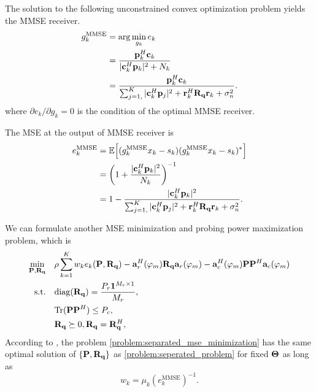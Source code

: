 The solution to the following unconstrained convex optimization problem yields the MMSE receiver.
\begin{align} \label{eqn:separated_mmse_receiver}
    g_k^{\mathrm{MMSE}} & = \arg \min_{g_k} e_k \nonumber
    \\ & = \frac{{\bf p}_k^H {\bf c}_k}{ | {\bf c}_k^H {\bf p}_k|^2 + N_k} \nonumber
    \\ & = \frac{{\bf p}_k^H {\bf c}_k}{\sum_{j=1, }^K |{\bf c}_k^H {\bf p}_j|^2 + {\bf r}_k^H {\bf R}_{\bf q} {\bf r}_k + \sigma^2_n}.
\end{align}
where $\partial e_k / \partial g_k = 0$ is the condition of the 
optimal MMSE receiver.

The MSE at the output of MMSE receiver is 
\begin{align} \label{eqn:separated_mmse_error}
    e_k^{\mathrm{MMSE}} & = \mathbb{E} \Big[(g_k^{\mathrm{MMSE}}x_k - s_k )(g_k^{\mathrm{MMSE}}x_k - s_k )^* \Big] \nonumber
    \\ & = \left(1+\frac{| {\bf c}_k^H {\bf p}_k|^2}{N_k} \right)^{-1} \nonumber
    \\ &= 1 - \frac{| {\bf c}_k^H {\bf p}_k|^2}{\sum_{j=1, }^K |{\bf c}_k^H {\bf p}_j|^2 + {\bf r}_k^H {\bf R}_{\bf q} {\bf r}_k + \sigma^2_n} .
\end{align} 

We can formulate another MSE minimization and probing power maximization problem, which is
\begin{subequations} \label{problem:separated_mse_minimization}
    \begin{align}
        \min_{\mathbf{P},\mathbf{R}_{\bf q}} \quad &  \rho \sum_{k=1}^K w_k e_k(\mathbf{P},\mathbf{R}_{\bf q}) -\mathbf{a}_r^H(\varphi_m)\mathbf{R}_{\bf q} \mathbf{a}_r(\varphi_m) - \mathbf{a}_c^H(\varphi_m)\mathbf{P}\mathbf{P}^H\mathbf{a}_c(\varphi_m)\\
        \mathrm{s.t.} \quad &\mathrm{diag}(\mathbf{R}_{\bf q}) = \frac{P_r \mathbf{1}^{M_r \times 1}}{M_r}, \\ 
        &\mathrm{Tr} (\mathbf{P}\mathbf{P}^H) \leq P_c, \\ 
        & \mathbf{R}_{\bf q} \succeq 0, {\bf R}_{\bf q} = {\bf R}_{\bf q}^H ,
    \end{align}
\end{subequations}
According to \cite{christensen2008weighted}, the problem \eqref{problem:separated_mse_minimization} has the 
same optimal solution of $\{{\bf{P}},{\bf{R}}_{\bf q}\}$ as \eqref{problem:seperated_problem} for fixed ${\bf \Theta}$ as long as
\begin{equation} \label{eqn:seperated_wmmse_weight}
    w_k = \mu_k (e_k^{\mathrm{MMSE}})^{-1}.
\end{equation}

